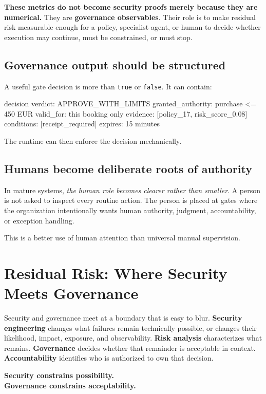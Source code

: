 \documentclass[10pt,oneside,openany]{book}
\newcommand{\term}[1]{\textbf{#1}}
\newcommand{\mono}[1]{\texttt{#1}}
\begin{document}
\textbf{These metrics do not become security proofs merely because they are numerical.} They are \term{governance observables}. Their role is to make residual risk measurable enough for a policy, specialist agent, or human to decide whether execution may continue, must be constrained, or must stop.

\section{Governance output should be structured}
A useful gate decision is more than \mono{true} or \mono{false}. It can contain:

\begin{codeblock}
decision {
  verdict: APPROVE_WITH_LIMITS
  granted_authority: purchase <= 450 EUR
  valid_for: this booking only
  evidence: [policy_17, risk_score_0.08]
  conditions: [receipt_required]
  expires: 15 minutes
}
\end{codeblock}

The runtime can then enforce the decision mechanically.

\section{Humans become deliberate roots of authority}
In mature systems, \emph{the human role becomes clearer rather than smaller}. A person is not asked to inspect every routine action. The person is placed at gates where the organization intentionally wants human authority, judgment, accountability, or exception handling.

This is a better use of human attention than universal manual supervision.

\chapter{Residual Risk: Where Security Meets Governance}\label{ch:residualrisk}

Security and governance meet at a boundary that is easy to blur. \term{Security engineering} changes what failures remain technically possible, or changes their likelihood, impact, exposure, and observability. \term{Risk analysis} characterizes what remains. \term{Governance} decides whether that remainder is acceptable in context. \term{Accountability} identifies who is authorized to own that decision.

\begin{center}
\sffamily\bfseries
Security constrains possibility.\\
Governance constrains acceptability.
\end{center}
\end{document}
